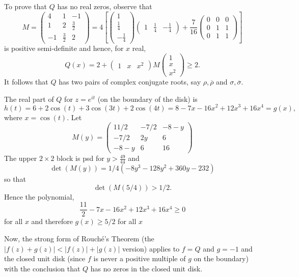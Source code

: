 \documentclass[a4paper,reqno,index]{amsart}
\numberwithin{equation}{section}
\newcommand{\ol}[1]{\overline{#1}}
\theoremstyle{definition}
\begin{document}
To prove that $Q$ has no real zeros, observe that 
\[
  M = \begin{pmatrix} 4 & 1 & -1 \\ 1 & 2 & \frac32 \\ -1 & \frac32 & 2\end{pmatrix}
    = 4 \left [ \begin{pmatrix} 1\\ \frac14 \\ -\frac14 \end{pmatrix}
    \begin{pmatrix} 1&  \frac14 & -\frac14 \end{pmatrix}+
      \frac{7}{16} \begin{pmatrix} 0&0&0\\0&  1 & 1  \\ 0& 1 & 1 \end{pmatrix} \right ]
\]
 is positive semi-definite and hence, for $x$ real, 
\[
Q(x) = {2+}\begin{pmatrix} 1 &  x &  x^2 \end{pmatrix}  M \begin{pmatrix} 1 \\ x\\ x^2 \end{pmatrix} \ge 2.
\]
 It follows that $Q$ has two pairs of complex conjugate roots, say $\rho,\ol{\rho}$ and $\sigma, \ol{\sigma}.$
 
The real part of $Q$ for $z=e^{it}$ (on the boundary of the disk) is
\[
  h(t) = 6 + 2\cos(t)+3\cos(3t)+2\cos(4t) = 
   8-7x-16x^2+12x^3+16x^4= g(x),
\]
 where $x=\cos(t).$  Let 
\[
  M(y) =\begin{pmatrix} 11/2 & - 7/2 & -8-y \\
    -7/2 & 2y & 6\\ -8-y & 6 & 16\end{pmatrix}
\]
 The upper $2\times 2$ block is psd for $y>\frac{49}{44}$
 and  
 \[
 \det(M(y)) =1/4 (-8 y^3 - 128 y^2 + 360 y - 232)
 \]
  so that 
\[
 \det(M(5/4)) >1/2. 
\]
 Hence the polynomial,
 \[
  \frac{11}{2}-7x-16x^2+12x^3+16x^4 \ge 0
 \]
  for all $x$ and therefore $g(x)\ge 5/2$ for all $x$


 Now, the strong form of Rouché's Theorem {(the $|f(z)+g(z)|<|f(z)|+|g(z)|$ version)} applies to $f=Q$ and $g=-1$ 
 and the closed unit disk (since $f$ is never a positive multiple of $g$ 
 on the boundary) with the conclusion that  $Q$ has no zeros in the closed unit disk.
\end{document}

